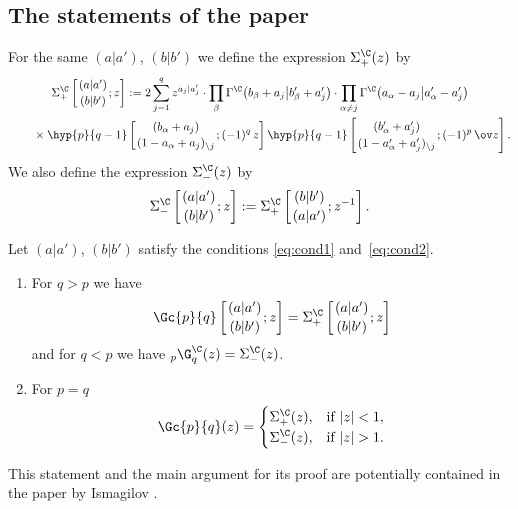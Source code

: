 \subsection{The statements of the paper}
For the same $(a|a')$, $(b|b')$ we define the expression
$\Sigma^\C_+(z)$ by
\begin{gather}
\Sigma^\C_+
\left[\genfrac{}{}{0pt}{}{(a|a')}{(b|b')};z\right]
:=2\sum_{j=1}^q z^{a_j|a_j'}\cdot \prod_{\beta}
\Gamma^\C\big(b_\beta+a_j\big|b_\beta'+a_j'\big)
\cdot \prod_{\alpha\ne j} \Gamma^\C\big(a_\alpha-a_j\big|a_\alpha'-a_j'\big) \nonumber\\
\qquad{}
\times
\hyp{p}{q-1}\left[\genfrac{}{}{0pt}{}{(b_\alpha+a_j)}
{(1-a_\alpha+a_j)_{\setminus j}};(-1)^q\,z\right]
\hyp{p}{q-1}\left[\genfrac{}{}{0pt}{}{(b_\alpha'+a_j')}
{(1-a_\alpha'+a_j')_{\setminus j}};(-1)^p\,\ov z\right].
 \label{eq:Xi}
\end{gather}
We also define the expression $\Sigma^\C_-(z)$ by
\[
\Sigma^\C_-
\left[\genfrac{}{}{0pt}{}{(a|a')}{(b|b')};z\right]
:=\Sigma^\C_+ \left[\genfrac{}{}{0pt}{}{(b|b')}{(a|a')};z^{-1}\right].
\]

\begin{Theorem}\label{th:1}
Let $(a|a')$, $(b|b')$ satisfy the conditions \eqref{eq:cond1} and~\eqref{eq:cond2}.
\begin{enumerate}\itemsep=0pt
\item[$(a)$] For $q>p$ we have
\[
\Gc{p}{q}\left[\genfrac{}{}{0pt}{}{(a|a')}{(b|b')};z\right]
=\Sigma^\C_+ \left[\genfrac{}{}{0pt}{}{(a|a')}{(b|b')};z\right]
\]
and for $q<p$ we have $_p\G^\C_q(z)=\Sigma^\C_-(z)$.
\item[$(b)$] For $p=q$
\[
\Gc{p}{q}(z)=
\begin{cases}
\Sigma^\C_+(z), & \text{if $|z|<1$}, \\
\Sigma^\C_-(z), & \text{if $|z|>1$}.
\end{cases}
\]
\end{enumerate}
\end{Theorem}

\begin{Remark} This statement and the main argument for its proof
are potentially contained in the paper by Ismagilov \cite[Lemma~2]{Ism2}.
\end{Remark}
